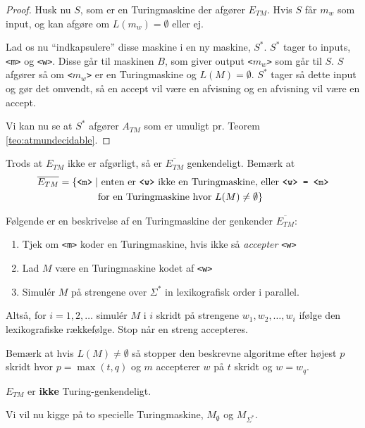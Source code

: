 \begin{proof}
	Husk nu $S$, som er en Turingmaskine der afgører $E_{TM}$. Hvis $S$ får $m_{w}$ som input, og kan afgøre om $L(m_{w}) = \emptyset$ eller ej.

	Lad os nu ``indkapsulere'' disse maskine i en ny maskine, $S^{*}$. $S^{*}$ tager to inputs, \texttt{<m>} og \texttt{<w>}. Disse går til maskinen $B$, som giver output \texttt{<$m_{w}$>} som går til $S$. $S$ afgører så om \texttt{<$m_{w}$>} er en Turingmaskine og $L(M) = \emptyset$. $S^{*}$ tager så dette input og gør det omvendt, så en accept vil være en afvisning og en afvisning vil være en accept.

	Vi kan nu se at $S^{*}$ afgører $A_{TM}$ som er umuligt pr. Teorem \ref{teo:atmundecidable}.
\end{proof}

Trods at $E_{TM}$ ikke er afgørligt, så er $\overline{E_{TM}}$ genkendeligt. Bemærk at
\begin{align*}
	\overline{E_{TM}} = \{  \text{\texttt{<m>}} \mid & \text{  enten er \texttt{<w>}  ikke en Turingmaskine, eller \texttt{<w> = <m>}} \\
	                                                 & \text{for en Turingmaskine hvor } L(M) \ne \emptyset\}
\end{align*}

Følgende er en beskrivelse af en Turingmaskine der genkender $\overline{E_{TM}}$:
\begin{enumerate}
	\item Tjek om \texttt{<m>} koder en Turingmaskine, hvis ikke så \textit{accepter} \texttt{<w>}
	\item Lad $M$ være en Turingmaskine kodet af \texttt{<w>}
	\item Simulér $M$ på strengene over $\Sigma^{*}$ in lexikografisk order i parallel.
\end{enumerate}

Altså, for $i = 1, 2, \ldots$ simulér $M$ i $i$ skridt på strengene $w_{1}, w_{2} , \ldots, w_{i}$ ifølge den lexikografiske rækkefølge. Stop når en streng accepteres.

Bemærk at hvis $L(M) \neq \emptyset$ så stopper den beskrevne algoritme efter højest $p$ skridt hvor $p = \max (t,q)$ og $m$ accepterer $w$ på $t$ skridt og $w = w_{q}$.

\begin{corollary}
	$E_{TM}$ er \textbf{ikke} Turing-genkendeligt.
\end{corollary}

Vi vil nu kigge på to specielle Turingmaskine, $M_{\emptyset}$ og $M_{\Sigma^{*}}$.

